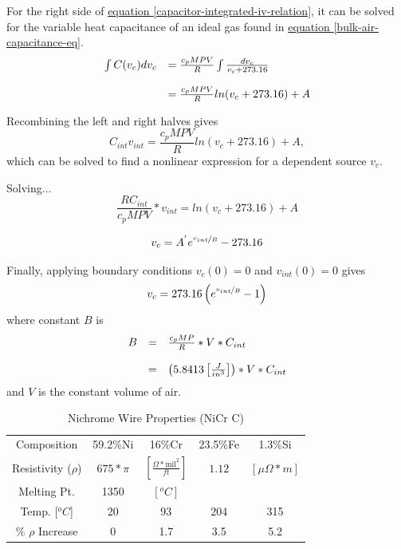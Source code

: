 \documentclass[10pt, twocolumn]{article}
\begin{document}
For the right side of
\hyperref[capacitor-integrated-iv-relation]
{equation \ref{capacitor-integrated-iv-relation}},
it can be solved for the variable heat capacitance
of an ideal gas found in
\hyperref[bulk-air-capacitance-eq]{equation \ref{bulk-air-capacitance-eq}}.
\begin{equation*}
\begin{array}{c l}
\int C(v_{c})dv_{c}	&=\frac{c_{p}MPV}{R}\int\frac{dv_{c}}{v_{c}+273.16}	\\
&\\
&=\frac{c_{p}MPV}{R}ln(v_{c}+273.16)+A	\\
\end{array}
\end{equation*}

Recombining the left and right halves gives
\begin{equation*}
C_{int}v_{int}=\frac{c_{p}MPV}{R}ln(v_{c}+273.16)+A,
\end{equation*}
which can be solved to find a nonlinear expression
for a dependent source $v_{c}$.

Solving...
\begin{equation*}
\frac{RC_{int}}{c_{p}MPV}*v_{int}=ln(v_{c}+273.16)+A
\end{equation*}

\begin{equation*}
v_{c}=A^{'}e^{\nicefrac{v_{int}}{B}}-273.16
\end{equation*}

Finally, applying boundary conditions $v_{c}(0)=0$ and $v_{int}(0)=0$ gives
\begin{equation}
v_{c}=273.16\left(e^{\nicefrac{v_{int}}{B}}-1\right)
\end{equation}
where constant $B$ is
\begin{equation}
\begin{array}{c c l}
B&=&\frac{c_{p}MP}{R}*V*C_{int}\\
&&\\
&=&\left(5.8413\left[\frac{J}{in^{3}}\right]\right)*V*C_{int}\\
\end{array}
\end{equation}
and $V$ is the constant volume of air.

\begin{table}
	\centering
	\caption{Nichrome Wire Properties (NiCr C)}
	\begin{adjustbox}{max width=\columnwidth}
	\begin{tabular}{c | c c c c}
\hline
Composition	&59.2\%Ni	&16\%Cr	&23.5\%Fe	&1.3\%Si	\\
Resistivity ($\rho$)	&$675*\pi$	&$\left[\frac{\Omega*\textrm{mil}^{2}}{ft}\right]$	&$1.12$	&$[\mu \Omega*m]$	\\
Melting Pt.	&1350	&$[^{o}C]$	&	&	\\
\hline\hline
Temp. [$^{o}C$]	&20	&93	&204	&315	\\
\% $\rho$ Increase	&0	&1.7	&3.5	&5.2	\\
\hline
	\end{tabular}
	\end{adjustbox}
	\label{nichrome-properties-table}
\end{table}
\end{document}
